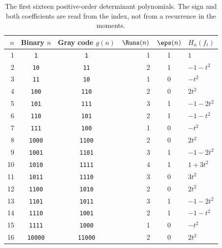 \begin{table}[H]
\centering\small
\renewcommand{\arraystretch}{1.1}
\begin{tabular}{@{}r c c r c l@{}}
\toprule
$n$ & Binary $n$ & Gray code $g(n)$ & $\Runs(n)$ & $\eps(n)$ & $H_n(f_t)$\\
\midrule
1 & \texttt{1} & \texttt{1} & 1 & 1 & $1$\\
2 & \texttt{10} & \texttt{11} & 2 & 1 & $-1-t^2$\\
3 & \texttt{11} & \texttt{10} & 1 & 0 & $-t^2$\\
4 & \texttt{100} & \texttt{110} & 2 & 0 & $2t^2$\\
5 & \texttt{101} & \texttt{111} & 3 & 1 & $-1-2t^2$\\
6 & \texttt{110} & \texttt{101} & 2 & 1 & $-1-t^2$\\
7 & \texttt{111} & \texttt{100} & 1 & 0 & $-t^2$\\
8 & \texttt{1000} & \texttt{1100} & 2 & 0 & $2t^2$\\
9 & \texttt{1001} & \texttt{1101} & 3 & 1 & $-1-2t^2$\\
10 & \texttt{1010} & \texttt{1111} & 4 & 1 & $1+3t^2$\\
11 & \texttt{1011} & \texttt{1110} & 3 & 0 & $3t^2$\\
12 & \texttt{1100} & \texttt{1010} & 2 & 0 & $2t^2$\\
13 & \texttt{1101} & \texttt{1011} & 3 & 1 & $-1-2t^2$\\
14 & \texttt{1110} & \texttt{1001} & 2 & 1 & $-1-t^2$\\
15 & \texttt{1111} & \texttt{1000} & 1 & 0 & $-t^2$\\
16 & \texttt{10000} & \texttt{11000} & 2 & 0 & $2t^2$\\
\bottomrule
\end{tabular}
\caption{The first sixteen positive-order determinant polynomials. The sign and both coefficients are read from the index, not from a recurrence in the moments.}
\label{tab:first}
\end{table}
